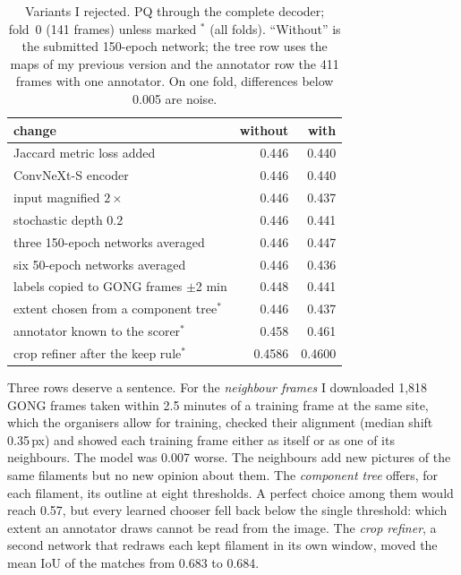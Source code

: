 \documentclass[sigconf]{acmart}
\begin{document}
\begin{table}[t]
\caption{Variants I rejected. PQ through the complete decoder; fold~0 (141 frames) unless marked
$^\ast$ (all folds). ``Without'' is the submitted 150-epoch network; the tree row uses the maps of
my previous version and the annotator row the 411 frames with one annotator. On one fold,
differences below 0.005 are noise.}
\label{tab:neg}
\small
\begin{tabular}{@{}lrr@{}}
\toprule
change & without & with \\
\midrule
Jaccard metric loss added & 0.446 & 0.440 \\
ConvNeXt-S encoder & 0.446 & 0.440 \\
input magnified $2\times$ & 0.446 & 0.437 \\
stochastic depth 0.2 & 0.446 & 0.441 \\
three 150-epoch networks averaged & 0.446 & 0.447 \\
six 50-epoch networks averaged & 0.446 & 0.436 \\
labels copied to GONG frames $\pm$2 min & 0.448 & 0.441 \\
extent chosen from a component tree$^\ast$ & 0.446 & 0.437 \\
annotator known to the scorer$^\ast$ & 0.458 & 0.461 \\
crop refiner after the keep rule$^\ast$ & 0.4586 & 0.4600 \\
\bottomrule
\end{tabular}
\end{table}

Three rows deserve a sentence. For the \emph{neighbour frames} I downloaded 1,818 GONG frames
taken within 2.5 minutes of a training frame at the same site, which the organisers allow for
training, checked their alignment (median shift 0.35\,px) and showed each training frame either
as itself or as one of its neighbours. The model was 0.007 worse. The neighbours add new pictures
of the same filaments but no new opinion about them. The \emph{component tree} offers, for each
filament, its outline at eight thresholds. A perfect choice among them would reach 0.57, but
every learned chooser fell back below the single threshold: which extent an annotator draws cannot
be read from the image. The \emph{crop refiner}, a second network that redraws each kept filament
in its own window, moved the mean IoU of the matches from 0.683 to 0.684.
\end{document}
